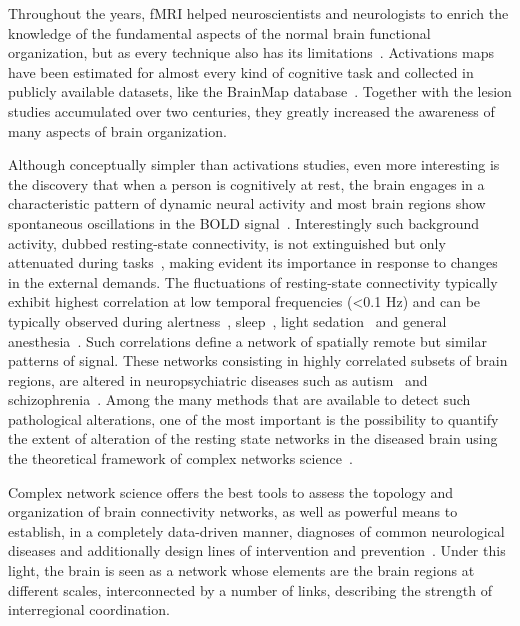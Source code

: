 Throughout the years, fMRI helped neuroscientists and neurologists to enrich the knowledge of the fundamental aspects of the normal brain functional organization, but as every technique also has its limitations~\cite{logothetis2008}. Activations maps have been estimated for almost every kind of cognitive task and collected in publicly available datasets, like the BrainMap database~\cite{fox2002}. Together with the lesion studies accumulated over two centuries, they greatly increased the awareness of many aspects of brain organization.

Although conceptually simpler than activations studies, even more interesting is the discovery that when a person is cognitively at rest, the brain engages in a characteristic pattern of dynamic neural activity and most brain regions show spontaneous oscillations in the BOLD signal~\cite{raichle2001,gusnard2001}. Interestingly such background activity, dubbed resting-state connectivity, is not extinguished but only attenuated during tasks~\cite{fransson2006}, making evident its importance in response to changes in the external demands.
The fluctuations of resting-state connectivity typically exhibit highest correlation at low temporal frequencies (<0.1 Hz) and can be typically observed during alertness~\cite{fox2006}, sleep~\cite{horovitz2009}, light sedation~\cite{greicius2008} and general anesthesia~\cite{martuzzi2010}.
Such correlations define a network of spatially remote but similar patterns of signal. These networks consisting in highly correlated subsets of brain regions, are altered in neuropsychiatric diseases such as autism~\cite{rudie2013} and schizophrenia~\cite{vandenheuvel2014}. 
Among the many methods that are available to detect such pathological alterations, one of the most important is the possibility to quantify the extent of alteration of the resting state networks in the diseased brain using the theoretical framework of complex networks science~\cite{sporns2000,sporns2002,sporns2004,bullmore2009,stam2014}.

Complex network science offers the best tools to assess the topology and organization of brain connectivity networks, as well as powerful means to establish, in a completely data-driven manner, diagnoses of common neurological diseases and additionally design lines of intervention and prevention~\cite{bullmore2009,stam2014,crossley2014}. Under this light, the brain is seen as a network whose elements are the brain regions at different scales, interconnected by a number of links, describing the strength of interregional coordination.

